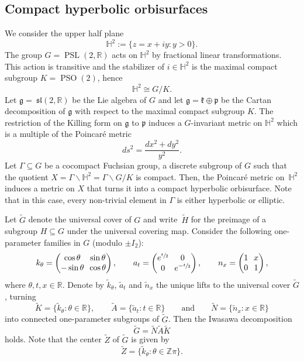 \documentclass[JEP,XML,SOM,Unicode,NoFloatCountersInSection,published]{cedram}
\theoremstyle{plain}
\theoremstyle{definition}
\theoremstyle{remark}
\newcommand{\R}{\mathbb{R}}
\newcommand{\Z}{\mathbb{Z}}
\renewcommand{\H}{\mathbb{H}}
\DeclareMathOperator{\PSL}{PSL}
\DeclareMathOperator{\PSO}{PSO}
\numberwithin{equation}{section}
\begin{document}
\subsection{Compact hyperbolic orbisurfaces}
\label{subsec:Orbi}
We consider the upper half plane
\[
\H^2:=\{z=x+iy:y>0\}.
\]
The group $G=\PSL(2,\R)$ acts on $\H^2$ by fractional linear transformations. This action is transitive and the stabilizer of $i\in\H^2$ is the maximal compact subgroup $K=\PSO(2)$, hence
\begin{equation*}
\H^2\cong G/K.
\end{equation*}
Let $\mathfrak{g}=~\mathfrak{sl}(2,\R)$ be the Lie algebra of $G$ and let $\mathfrak{g}=\mathfrak{k}\oplus\mathfrak{p}$ be the Cartan decomposition of $\mathfrak{g}$ with respect to the maximal compact subgroup $K$.
The restriction of the Killing form on $\mathfrak{g}$ to $\mathfrak{p}$ induces a $G$-invariant metric on $\H^2$ which is a multiple of the Poincaré metric
\begin{equation*}
ds^2=\frac{dx^2+dy^2}{y^2}.
\end{equation*}
Let $\Gamma\subseteq G$ be a cocompact Fuchsian group, \ie a discrete subgroup of $G$ such that the quotient $X=\Gamma\backslash \H^2=\Gamma\backslash G/K$ is compact. Then, the Poincaré metric on~$\H^2$ induces a metric on $X$ that turns it into a compact hyperbolic orbisurface. Note that in this case, every non-trivial element in $\Gamma$ is either hyperbolic or elliptic.

Let $\widetilde{G}$ denote the universal cover of $G$ and write~$\widetilde{H}$ for the preimage of a subgroup $H\subseteq G$ under the universal covering map. Consider the following one-parameter families in $G$ (modulo $\pm I_2$):
\[\arraycolsep3.5pt
k_\theta=\begin{pmatrix}\cos\theta&\sin\theta\\-\sin\theta&\cos\theta\end{pmatrix}, \qquad a_t=\begin{pmatrix}e^{\sfrac{t}{2}}&0\\0&e^{-\sfrac{t}{2}}\end{pmatrix}, \qquad n_x=\begin{pmatrix}1&x\\0&1\end{pmatrix},
\]
where $\theta,t,x\in\R$. Denote by $\widetilde{k}_\theta$, $\widetilde{a}_t$ and $\widetilde{n}_x$ the unique lifts to the universal cover $\widetilde{G}$, turning
\[
\widetilde{K}=\{\widetilde{k}_\theta:\theta\in\R\}, \qquad \widetilde{A}=\{\widetilde{a}_t:t\in\R\} \qquad \mbox{and} \qquad \widetilde{N}=\{\widetilde{n}_x:x\in\R\}
\]
into connected one-parameter subgroups of $\widetilde{G}$. Then the Iwasawa decomposition
\[
\widetilde{G} = \widetilde{N}\widetilde{A}\widetilde{K}
\]
holds. Note that the center $\widetilde{Z}$ of $\widetilde{G}$ is given by
\[
\widetilde{Z} = \{\widetilde{k}_\theta:\theta\in\Z\pi\}.
\]
\end{document}
